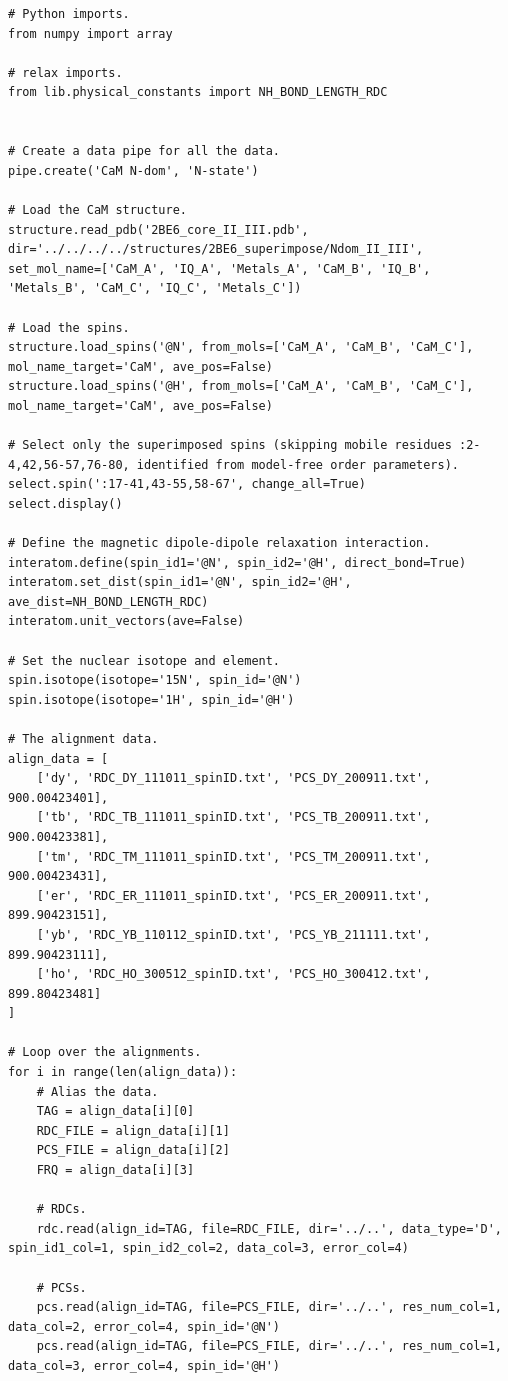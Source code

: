 \begin{lstlisting}
# Python imports.
from numpy import array

# relax imports.
from lib.physical_constants import NH_BOND_LENGTH_RDC


# Create a data pipe for all the data.
pipe.create('CaM N-dom', 'N-state')

# Load the CaM structure.
structure.read_pdb('2BE6_core_II_III.pdb', dir='../../../../structures/2BE6_superimpose/Ndom_II_III', set_mol_name=['CaM_A', 'IQ_A', 'Metals_A', 'CaM_B', 'IQ_B', 'Metals_B', 'CaM_C', 'IQ_C', 'Metals_C'])

# Load the spins.
structure.load_spins('@N', from_mols=['CaM_A', 'CaM_B', 'CaM_C'], mol_name_target='CaM', ave_pos=False)
structure.load_spins('@H', from_mols=['CaM_A', 'CaM_B', 'CaM_C'], mol_name_target='CaM', ave_pos=False)

# Select only the superimposed spins (skipping mobile residues :2-4,42,56-57,76-80, identified from model-free order parameters).
select.spin(':17-41,43-55,58-67', change_all=True)
select.display()

# Define the magnetic dipole-dipole relaxation interaction.
interatom.define(spin_id1='@N', spin_id2='@H', direct_bond=True)
interatom.set_dist(spin_id1='@N', spin_id2='@H', ave_dist=NH_BOND_LENGTH_RDC)
interatom.unit_vectors(ave=False)

# Set the nuclear isotope and element.
spin.isotope(isotope='15N', spin_id='@N')
spin.isotope(isotope='1H', spin_id='@H')

# The alignment data.
align_data = [
    ['dy', 'RDC_DY_111011_spinID.txt', 'PCS_DY_200911.txt', 900.00423401],
    ['tb', 'RDC_TB_111011_spinID.txt', 'PCS_TB_200911.txt', 900.00423381],
    ['tm', 'RDC_TM_111011_spinID.txt', 'PCS_TM_200911.txt', 900.00423431],
    ['er', 'RDC_ER_111011_spinID.txt', 'PCS_ER_200911.txt', 899.90423151],
    ['yb', 'RDC_YB_110112_spinID.txt', 'PCS_YB_211111.txt', 899.90423111],
    ['ho', 'RDC_HO_300512_spinID.txt', 'PCS_HO_300412.txt', 899.80423481]
]

# Loop over the alignments.
for i in range(len(align_data)):
    # Alias the data.
    TAG = align_data[i][0]
    RDC_FILE = align_data[i][1]
    PCS_FILE = align_data[i][2]
    FRQ = align_data[i][3]

    # RDCs.
    rdc.read(align_id=TAG, file=RDC_FILE, dir='../..', data_type='D', spin_id1_col=1, spin_id2_col=2, data_col=3, error_col=4)

    # PCSs.
    pcs.read(align_id=TAG, file=PCS_FILE, dir='../..', res_num_col=1, data_col=2, error_col=4, spin_id='@N')
    pcs.read(align_id=TAG, file=PCS_FILE, dir='../..', res_num_col=1, data_col=3, error_col=4, spin_id='@H')


\end{lstlisting}

